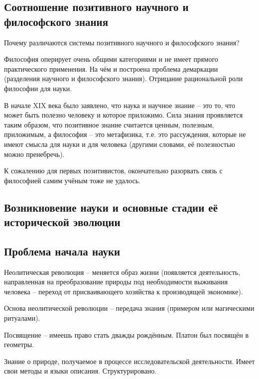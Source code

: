 \documentclass[main.tex]{subfiles}
\begin{document}
\subsection{Соотношение позитивного научного и философского знания}


Почему различаются системы позитивного научного и философского знания?

Философия оперирует очень общими категориями и не имеет прямого практического применения.
На чём и построена проблема демаркации (разделения научного и философского знания).
Отрицание рациональной роли философии для науки.

В начале XIX века было заявлено, что наука и научное знание -- это то, что может быть полезно человеку и которое приложимо.
Сила знания проявляется таким образом, что позитивное знание считается ценным, полезным, приложимым, а философия -- это метафизика, т.е. это рассуждения, которые не имеют смысла для науки и для человека (другими словами, её полезностью можно пренебречь).

К сожалению для первых позитивистов, окончательно разорвать связь с философией самим учёным тоже не удалось.

\subsection{Возникновение науки и основные стадии её исторической эволюции}


\subsection{Проблема начала науки}


Неолитическая революция -- меняется образ жизни (появляется деятельность, направленная на преобразование природы под необходимости выживания человека -- переход от присваивающего хозяйства к производящей экономике).

Основа неолитической революции -- передача знания (примером или магическими ритуалами).

Посвящение -- имеешь право стать дважды рождённым.
Платон был посвящён в геометры.


Знание о природе, получаемое в процессе исследовательской деятельности.
Имеет свои методы и языки описания.
Структурировано.
\end{document}
